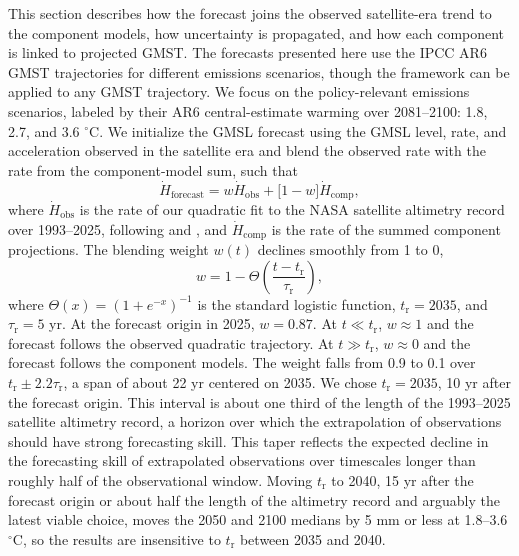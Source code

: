 \documentclass[draft,linenumbers]{agujournal2025}
\begin{document}
This section describes how the forecast joins the observed satellite-era trend to the component models, how uncertainty is propagated, and how each component is linked to projected GMST. The forecasts presented here use the IPCC AR6 GMST trajectories for different emissions scenarios, though the framework can be applied to any GMST trajectory. We focus on the policy-relevant emissions scenarios, labeled by their AR6 central-estimate warming over 2081--2100: 1.8, 2.7, and 3.6 $^\circ$C. We initialize the GMSL forecast using the GMSL level, rate, and acceleration observed in the satellite era and blend the observed rate with the rate from the component-model sum, such that
\begin{equation}
	\dot{H}_{\mathrm{forecast}} = w\dot{H}_{\mathrm{obs}} + \bigl[1 - w\bigr]\dot{H}_{\mathrm{comp}},
	\label{eq:blend_rate}
\end{equation}
where $\dot{H}_{\mathrm{obs}}$ is the rate of our quadratic fit to the NASA satellite altimetry record over 1993--2025, following \citet{Nerem2022} and \citet{Hamlington2024}, and $\dot{H}_{\mathrm{comp}}$ is the rate of the summed component projections. The blending weight $w(t)$ declines smoothly from 1 to 0,
\begin{equation}
	w = 1 - \Theta\left(\frac{t - t_{\mathrm{r}}}{\tau_{\mathrm{r}}}\right),
	\label{eq:sigmoid_weight}
\end{equation}
where $\Theta(x) =(1 + e^{-x})^{-1}$ is the standard logistic function, $t_{\mathrm{r}} = 2035$, and $\tau_{\mathrm{r}} = 5$ yr. At the forecast origin in 2025, $w = 0.87$. At $t \ll t_{\mathrm{r}}$, $w \approx 1$ and the forecast follows the observed quadratic trajectory. At $t \gg t_{\mathrm{r}}$, $w \approx 0$ and the forecast follows the component models. The weight falls from 0.9 to 0.1 over $t_{\mathrm{r}} \pm 2.2\tau_{\mathrm{r}}$, a span of about 22 yr centered on 2035. We chose $t_{\mathrm{r}} = 2035$, 10 yr after the forecast origin. This interval is about one third of the length of the 1993--2025 satellite altimetry record, a horizon over which the extrapolation of observations should have strong forecasting skill. This taper reflects the expected decline in the forecasting skill of extrapolated observations over timescales longer than roughly half of the observational window. Moving $t_{\mathrm{r}}$ to 2040, 15 yr after the forecast origin or about half the length of the altimetry record and arguably the latest viable choice, moves the 2050 and 2100 medians by 5 mm or less at 1.8--3.6 $^\circ$C, so the results are insensitive to $t_{\mathrm{r}}$ between 2035 and 2040.
\end{document}

